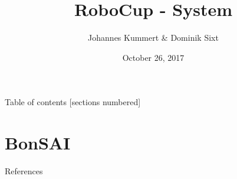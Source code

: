 \documentclass[10pt]{beamer}
\title{RoboCup - System}
\date{October 26, 2017}
\author{Johannes Kummert \& Dominik Sixt}
\begin{document}
\maketitle

\begin{frame}{Table of contents}
  [sections numbered]
  \tableofcontents[hideallsubsections]
\end{frame}











\section{BonSAI} %



\begin{frame}[allowframebreaks]{References}

\nocite{*}
  
  

\end{frame}
\end{document}
